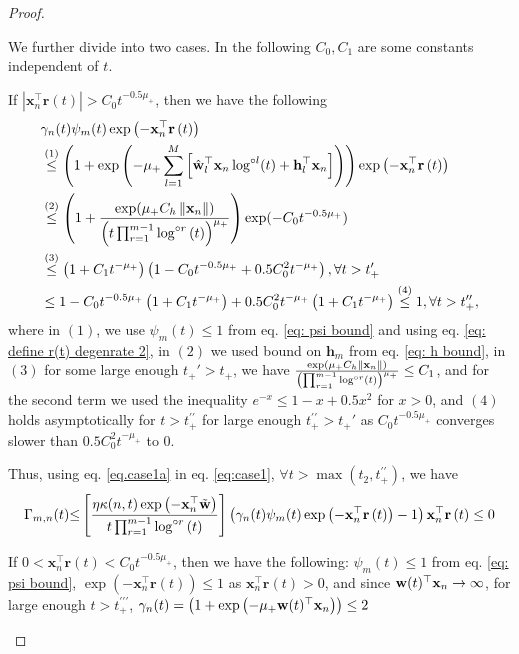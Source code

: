\documentclass[twoside,11pt,english]{article}
\newcommand{\norm}[1]{\left\lVert{#1}\right\rVert}
\begin{document}
\begin{proof}
\begin{asparaenum}
We further divide into two cases. In the following $C_0,C_1$ are some constants independent of $t$.
\begin{compactenum}
\item If $\left|\mathbf{x}_{n}^{\top}\mathbf{r}\left(t\right)\right|>C_0t^{-0.5\mu_+}$, then we have the following
\begin{align}
&\gamma_n(t)\psi_m(t)\exp\left(-\mathbf{x}_{n}^{\top}\mathbf{r}\left(t\right)\right) \nonumber \\
& \overset{(1)}\le\left(1+\exp\left(-\mu_+\sum_{l=1}^M\left[\hat{\mathbf{w}}_l^\top \xn\log^{\circ l}(t)+\mathbf{h}_{l}^\top\xn\right]\right)\right)\exp\left(-\mathbf{x}_{n}^{\top}\mathbf{r}\left(t\right)\right)\nonumber\\
&\overset{(2)}\le\left(1+\frac{\exp(\mu_+C_h\norm{\xn})}{\left(t\prod_{r=1}^{m-1}\log^{\circ r}\left(t\right)\right)^{\mu_+}}\right)\exp(-C_0t^{-0.5\mu_+})\nonumber\\
&\overset{(3)}\le \left(1+C_1t^{-\mu_+}\right)\left(1-C_0t^{-0.5\mu_+}+0.5C_0^2t^{-\mu_+}\right),\forall t>t_+'\nonumber\\
&\le 1-C_0t^{-0.5\mu_+}\left(1+C_1t^{-\mu_+}\right)+0.5C_0^2t^{-\mu_+}\left(1+C_1t^{-\mu_+}\right)\overset{(4)}\le 1,\forall t>t_+^{\prime\prime},
\label{eq.case1a}
\end{align}
where in $(1)$, we use $\psi_m(t)\le 1$ from eq. \ref{eq: psi bound} and using eq. \ref{eq: define r(t) degenrate 2}, in $(2)$ we used bound on $\mathbf{h}_{m}$ from eq. \ref{eq: h bound}, in $(3)$ for some large enough $t_+'>t_+$, we have $\frac{\exp(\mu_+C_h\norm{\xn})}{\left(\prod_{r=1}^{m-1}\log^{\circ r}\left(t\right)\right)^{\mu_+}}\le C_1$,  and for the second term we used the inequality $e^{-x}\le 1-x+0.5 x^2$ for $x>0$, and $(4)$ holds asymptotically for $t>t_+^{\prime\prime}$ for large enough $t_+^{\prime\prime}>t_+'$  as $C_0t^{-0.5\mu_+}$ converges slower than $0.5C_0^2t^{-\mu_+}$ to 0. 

Thus, using eq. \ref{eq.case1a}  in eq. \ref{eq:case1}, $\forall t>\max{(t_2,t_+^{\prime\prime})}$, we have
\begin{align*}
 \Gamma_{m,n}(t)
{\leq} \left[\frac{\eta\kappa(n,t)\exp\left(-\mathbf{x}_{n}^{\top}\tilde{\mathbf{w}}\right)}{t\prod_{r=1}^{m-1}\log^{\circ r}\left(t\right)}\right]\left(\gamma_n(t)\psi_m(t)\exp\left(-\mathbf{x}_{n}^{\top}\mathbf{r}\left(t\right)\right)-1\right)\mathbf{x}_{n}^{\top}\mathbf{r}\left(t\right)\le0
\end{align*}

\item If $0<\mathbf{x}_{n}^{\top}\mathbf{r}\left(t\right)<C_0t^{-0.5\mu_+}$, then we have the following: $\psi_m(t)\le 1$ from eq. \ref{eq: psi bound}, 
 $\exp\left(-\mathbf{x}_{n}^{\top}\mathbf{r}\left(t\right)\right)\le1$ as $\mathbf{x}_{n}^{\top}\mathbf{r}\left(t\right)>0$,  and since $\mathbf{w}(t)^\top\mathbf{x}_{n}\to\infty$, for large enough $t>t_+^{\prime\prime\prime}$, $\gamma_n(t)=\left(1+\exp\left(-\mu_+\mathbf{w}(t)^\top\mathbf{x}_{n}\right)\right)\le2$
 

\end{compactenum}
\end{asparaenum}
\end{proof}
\end{document}
